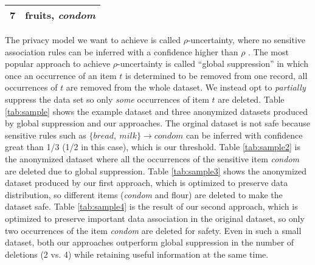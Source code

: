 \begin{table*}[bth]
{\begin{tabular}{|c|l|}
7& fruits, {\em condom}  \\ \hline
\end{tabular}
\label{tab:sample3}
}
\end{table*}

The privacy model we want to achieve is called $\rho$-uncertainty, where
no sensitive association rules can be inferred with a confidence higher than
$\rho$ \cite{Cao:2010:rho}.
%
The most popular approach to achieve $\rho$-uncertainty is called ``global
suppression'' \cite{Cao:2010:rho} in which once an occurrence of an item $t$ is
determined to be removed from one record, all occurrences of $t$ are
removed from the whole dataset. We instead opt to {\em partially}
suppress the data set so only {\em some} occurrences of item $t$ are
deleted.
Table \ref{tab:sample} shows the example dataset
and three anonymized datasets produced by global suppression and our approaches.
The orginal dataset is not safe because sensitive rules such as
$\{bread,~milk\} \rightarrow condom$
can be inferred with confidence great than 1/3 (1/2 in this case), which is our threshold.
Table \ref{tab:sample2} is the anonymized dataset where all the occurrences of
the sensitive item {\em condom} are deleted due to global suppression.
Table \ref{tab:sample3} shows the anonymized dataset produced by our first
approach, which is optimized to preserve data distribution, so different
items ({\em condom} and flour) are deleted to make the dataset safe.
Table \ref{tab:sample4} is the result of our second approach, which is optimized
to preserve important data association in the original dataset, so only
two occurrences of the item {\em condom} are deleted for safety.
Even in such a small dataset, both our approaches outperform global suppression
in the number of deletions (2 vs. 4) while retaining useful information at the same time.

